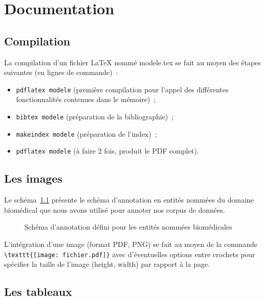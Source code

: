 \chapter{Documentation}

\section{Compilation}
\label{sec:compilation}
La compilation d'un fichier \LaTeX{} nommé \og{}modele.tex\fg{} se fait au moyen des étapes suivantes (en lignes de commande)~:
%
\begin{itemize}
\item \verb+pdflatex modele+ (première compilation pour l'appel des différentes fonctionnalités contenues dans le mémoire)~;
\item \verb+bibtex modele+ (préparation de la bibliographie)~;
\item \verb+makeindex modele+ (préparation de l'index)~;
\item \verb+pdflatex modele+ (à faire 2 fois, produit le PDF complet).
\end{itemize}




\section{Les images}
\label{sec:images}

Le  schéma~\ref{fig:schema} présente le schéma
d'annotation en entités nommées du domaine biomédical que nous avons
utilisé pour annoter nos corpus de données.
%
\begin{figure}[h]
  \centering
  \caption{Schéma d'annotation défini pour les entités nommées
    biomédicales}
  \label{fig:schema}
\end{figure}

L'intégration d'une image (format PDF, PNG) se fait au moyen de la
commande \verb+\texttt{[image: fichier.pdf]}+ avec d'éventuelles
options entre crochets pour spécifier la taille de l'image (height,
width) par rapport à la page.



\newpage
\section{Les tableaux}
\label{sec:tableaux}

